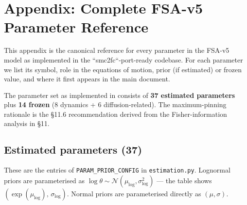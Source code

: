 \section*{Appendix: Complete FSA-v5 Parameter Reference}
\label{sec:appendix-v5-parameters}

This appendix is the canonical reference for every parameter in the
FSA-v5 model as implemented in the ``smc2fc``-port-ready codebase. For
each parameter we list its symbol, role in the equations of motion,
prior (if estimated) or frozen value, and where it first appears in the
main document.

The parameter set as implemented in
 consists of \textbf{37
estimated parameters} plus \textbf{14 frozen} (8 dynamics +
6 diffusion-related). The maximum-pinning rationale is the §11.6
recommendation derived from the Fisher-information analysis in §11.

\subsection*{Estimated parameters (37)}

These are the entries of \texttt{PARAM\_PRIOR\_CONFIG} in
\texttt{estimation.py}. Lognormal priors are parameterised as
$\log\theta \sim \mathcal{N}(\mu_{\log}, \sigma_{\log}^2)$ — the table
shows $(\exp(\mu_{\log}),\, \sigma_{\log})$. Normal priors are
parameterised directly as $(\mu, \sigma)$.

